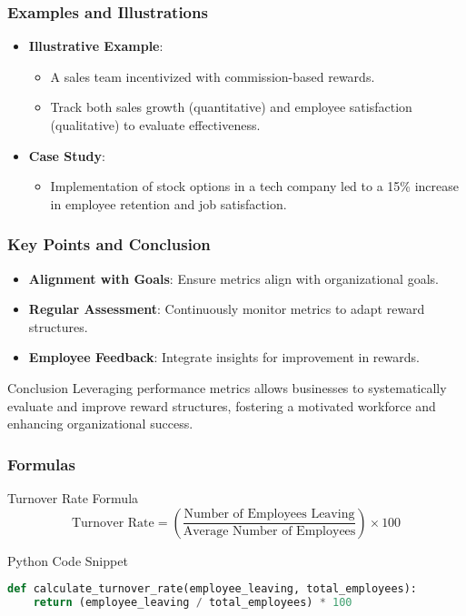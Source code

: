 \documentclass[aspectratio=169]{beamer}
\begin{document}
\begin{frame}[fragile]
    \frametitle{Examples and Illustrations}
    \begin{itemize}
        \item \textbf{Illustrative Example}: 
        \begin{itemize}
            \item A sales team incentivized with commission-based rewards. 
            \item Track both sales growth (quantitative) and employee satisfaction (qualitative) to evaluate effectiveness.
        \end{itemize}
        
        \item \textbf{Case Study}: 
        \begin{itemize}
            \item Implementation of stock options in a tech company led to a 15\% increase in employee retention and job satisfaction.
        \end{itemize}
    \end{itemize}
\end{frame}

\begin{frame}[fragile]
    \frametitle{Key Points and Conclusion}
    \begin{itemize}
        \item \textbf{Alignment with Goals}: Ensure metrics align with organizational goals.
        \item \textbf{Regular Assessment}: Continuously monitor metrics to adapt reward structures.
        \item \textbf{Employee Feedback}: Integrate insights for improvement in rewards.
    \end{itemize}
    \begin{block}{Conclusion}
        Leveraging performance metrics allows businesses to systematically evaluate and improve reward structures, fostering a motivated workforce and enhancing organizational success.
    \end{block}
\end{frame}

\begin{frame}[fragile]
    \frametitle{Formulas}
    \begin{block}{Turnover Rate Formula}
        \[
        \text{Turnover Rate} = \left( \frac{\text{Number of Employees Leaving}}{\text{Average Number of Employees}} \right) \times 100
        \]
    \end{block}
    \begin{block}{Python Code Snippet}
        \begin{lstlisting}[language=Python]
def calculate_turnover_rate(employee_leaving, total_employees):
    return (employee_leaving / total_employees) * 100
        \end{lstlisting}
    \end{block}
\end{frame}
\end{document}
